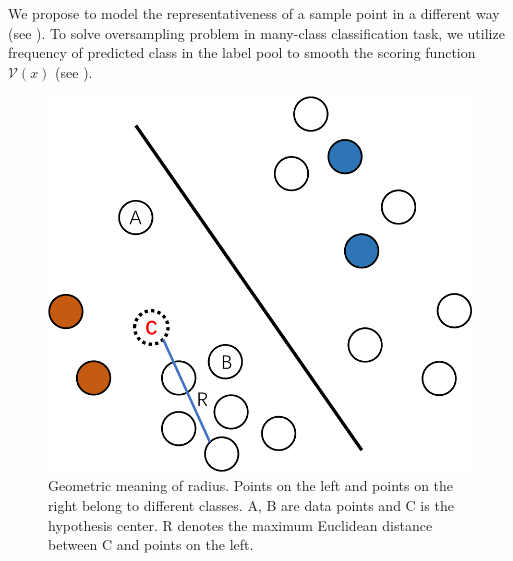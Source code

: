 

We propose to model the representativeness of a sample
point in a different way (see ). To solve oversampling problem in many-class classification task, we utilize frequency of predicted class in the label pool to smooth the scoring function $\mathcal{V}(x)$ (see ).

\begin{figure}[th]
\centering
\includegraphics[scale=0.3]{figs/radius.pdf}
\caption{Geometric meaning of radius. Points on the left and points on the right
belong to different classes. A, B are data points and C is the hypothesis center. 
R denotes the maximum Euclidean distance between C and points on the left.}
\label{fig:radius}
\end{figure}

